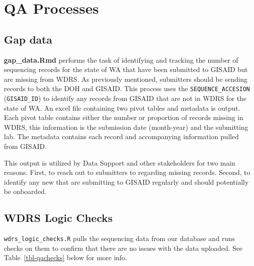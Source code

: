 \documentclass[
  letterpaper,
  DIV=11,
  numbers=noendperiod]{scrartcl}
\begin{document}
\section{QA Processes}\label{qa-processes}

\subsection{Gap data}\label{gap-data}

\textbf{gap\_data.Rmd} performs the task of identifying and tracking the
number of sequencing records for the state of WA that have been
submitted to GISAID but are missing from WDRS. As previously mentioned,
submitters should be sending records to both the DOH and GISAID. This
process uses the \texttt{SEQUENCE\_ACCESION} (\texttt{GISAID\_ID}) to
identify any records from GISAID that are not in WDRS for the state of
WA. An excel file containing two pivot tables and metadata is output.
Each pivot table contains either the number or proportion of records
missing in WDRS, this information is the submission date (month-year)
and the submitting lab. The metadata contains each record and
accompanying information pulled from GISAID.

This output is utilized by Data Support and other stakeholders for two
main reasons. First, to reach out to submitters to regarding missing
records. Second, to identify any new that are submitting to GISAID
regularly and should potentially be onboarded.

\subsection{WDRS Logic Checks}\label{wdrs-logic-checks}

\texttt{wdrs\_logic\_checks.R} pulls the sequencing data from our
database and runs checks on them to confirm that there are no issues
with the data uploaded. See Table~\ref{tbl-qachecks} below for more
info.
\end{document}
